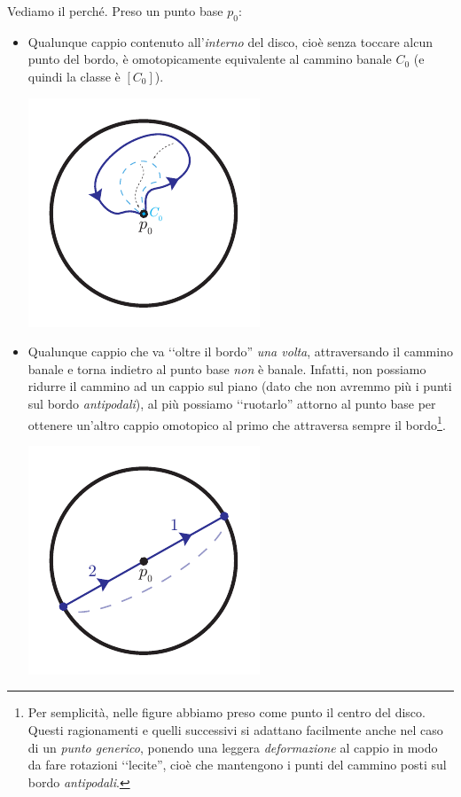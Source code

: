 \begin{itemize}
	Vediamo il perché. Preso un punto base $p_0$:
		\begin{itemize}
				\item Qualunque cappio contenuto all'\textit{interno} del disco, cioè senza toccare alcun punto del bordo, è omotopicamente equivalente al cammino banale $C_0$ (e quindi la classe è $\left[C_0\right]$).
			\begin{center}
				\includegraphics[trim=0cm 0cm 0cm 0cm,clip,scale=0.95]{images/projdiscindisc.pdf}
			\end{center}
			\item Qualunque cappio che va ‘‘oltre il bordo'' \textit{una volta}, attraversando il cammino banale e torna indietro al punto base \textit{non} è banale. Infatti, non possiamo ridurre il cammino ad un cappio sul piano (dato che non avremmo più i punti sul bordo \textit{antipodali}), al più possiamo ‘‘ruotarlo'' attorno al punto base per ottenere un'altro cappio omotopico al primo che attraversa sempre il bordo\footnote{Per semplicità, nelle figure abbiamo preso come punto il centro del disco. Questi ragionamenti e quelli successivi si adattano facilmente anche nel caso di un \textit{punto generico}, ponendo una leggera \textit{deformazione} al cappio in modo da fare rotazioni ‘‘lecite'', cioè che mantengono i punti del cammino posti sul bordo \textit{antipodali}.}.
						\begin{center}
				\includegraphics[trim=0cm 0cm 0cm 0cm,clip,scale=0.95]{images/projdiscoverborder1.pdf}

\end{center}
\end{itemize}
\end{itemize}
